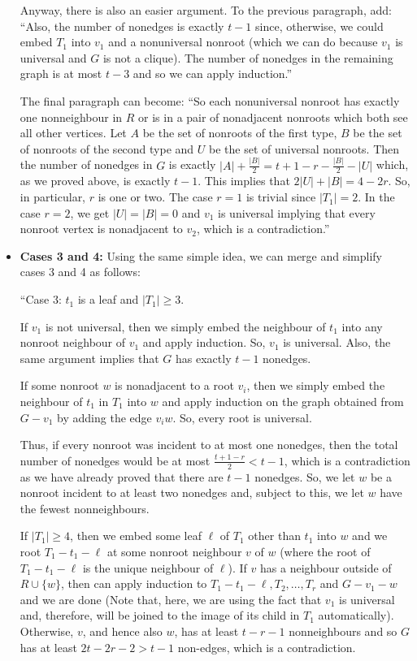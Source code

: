 \documentclass[11 pt]{article}
\begin{document}
\begin{itemize}
Anyway, there is also an easier argument. To the previous paragraph, add: ``Also, the number of nonedges is exactly $t-1$ since, otherwise, we could embed $T_1$ into $v_1$ and a nonuniversal nonroot (which we can do because $v_1$ is universal and $G$ is not a clique). The number of nonedges in the remaining graph is at most $t-3$ and so we can apply induction.''

The final paragraph can become: ``So each nonuniversal nonroot has exactly one nonneighbour in $R$ or is in a pair of nonadjacent nonroots which both see all other vertices. Let $A$ be the set of nonroots of the first type, $B$ be the set of nonroots of the second type and $U$ be the set of universal nonroots. Then the number of nonedges in $G$ is exactly $|A| + \frac{|B|}{2} = t+1-r - \frac{|B|}{2} - |U|$ which, as we proved above, is exactly $t-1$. This implies that $2|U| + |B| = 4-2r$. So, in particular, $r$ is one or two. The case $r=1$ is trivial since $|T_1|=2$. In the case $r=2$, we get $|U|=|B|=0$ and $v_1$ is universal implying that every nonroot vertex is nonadjacent to $v_2$, which is a contradiction.''
\item \textbf{Cases 3 and 4:} Using the same simple idea, we can merge and simplify cases 3 and 4 as follows:

``Case 3: $t_1$ is a leaf and $|T_1|\geq3$.

If $v_1$ is not universal, then we simply embed the neighbour of $t_1$ into any nonroot neighbour of $v_1$ and apply induction. So, $v_1$ is universal. Also, the same argument implies that $G$ has exactly $t-1$ nonedges.

If some nonroot $w$ is nonadjacent to a root $v_i$, then we simply embed the neighbour of $t_1$ in $T_1$ into $w$ and apply induction on the graph obtained from $G-v_1$ by adding the edge $v_iw$. So, every root is universal. 

Thus, if every nonroot was incident to at most one nonedges, then the total number of nonedges would be at most $\frac{t+1-r}{2}< t-1$, which is a contradiction as we have already proved that there are $t-1$ nonedges. So, we let $w$ be a nonroot incident to at least two nonedges and, subject to this, we let $w$ have the fewest nonneighbours. 

If $|T_1|\geq 4$, then we embed some leaf $\ell$ of $T_1$ other than $t_1$ into $w$ and we root $T_1-t_1-\ell$ at some nonroot neighbour $v$ of $w$ (where the root of $T_1-t_1-\ell$ is the unique neighbour of $\ell$). If $v$ has a neighbour outside of $R\cup\{w\}$, then can apply induction to $T_1-t_1-\ell,T_2,\dots,T_r$ and $G-v_1-w$ and we are done (Note that, here, we are using the fact that $v_1$ is universal and, therefore, will be joined to the image of its child in $T_1$ automatically). Otherwise, $v$, and hence also $w$, has at least $t-r-1$ nonneighbours and so $G$ has at least $2t-2r-2 > t-1$ non-edges, which is a contradiction. 


\end{itemize}
\end{document}
